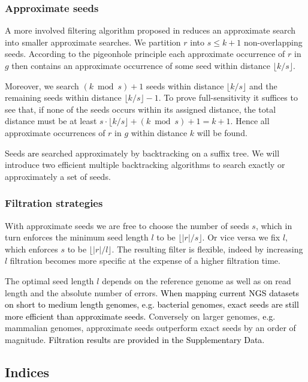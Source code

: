 \documentclass[a4,center,fleqn]{article}
\newcommand{\eg}{{e.g.}\xspace}
\begin{document}
\subsubsection{Approximate seeds}
A more involved filtering algorithm proposed in \cite{Navarro2000} reduces an approximate search into smaller approximate searches.
We partition $r$ into $s \leq k+1$ non-overlapping seeds.
According to the pigeonhole principle each approximate occurrence of $r$ in $g$ then contains an approximate occurrence of some seed within distance $\lfloor k/s \rfloor$.

Moreover, we search $(k \bmod{s}) + 1$ seeds within distance $\lfloor k/s \rfloor$ and the remaining seeds within distance $\lfloor k/s \rfloor - 1$.
To prove full-sensitivity it suffices to see that, if none of the seeds occurs within its assigned distance, the total distance must be at least $s \cdot \lfloor k/s \rfloor + (k \bmod s) + 1 = k + 1$.
Hence all approximate occurrences of $r$ in $g$ within distance $k$ will be found.

Seeds \textcolor{black}{are} searched approximately by backtracking on a suffix tree.
We will introduce two efficient multiple backtracking algorithms to search exactly or approximately a set of seeds.

\subsubsection{Filtration strategies}
With approximate seeds we are free to choose the number of seeds $s$, which in turn enforces the minimum seed length $l$ to be $\lfloor |r|/s \rfloor$.
Or vice versa we fix $l$, which enforces $s$ to be $\lfloor |r|/l \rfloor$.
The resulting filter is flexible, indeed by increasing $l$ filtration becomes more specific at the expense of a higher filtration time.

The optimal seed length $l$ depends on the reference genome as well as on read length and the absolute number of errors.
\textcolor{black}{
When mapping current NGS datasets on short to medium length genomes, \eg bacterial genomes, exact seeds are still more efficient than approximate seeds.}
Conversely on larger genomes, \textcolor{black}{\eg} mammalian genomes, approximate seeds outperform exact seeds by an order of magnitude.
\textcolor{black}{Filtration results are provided in the Supplementary Data.}




\subsection{Indices}
\label{sub:Indices}
\end{document}
